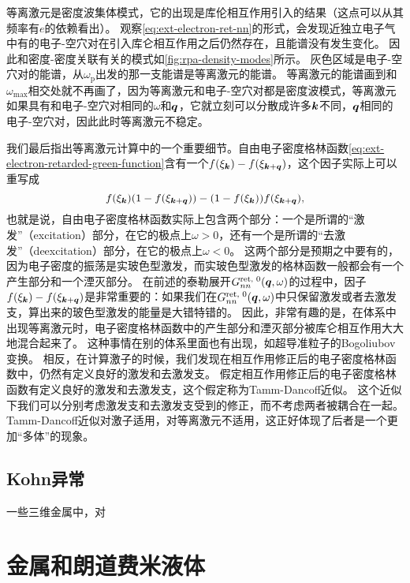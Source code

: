 等离激元是密度波集体模式，它的出现是库伦相互作用引入的结果（这点可以从其频率有$e$的依赖看出）。
观察\eqref{eq:ext-electron-ret-nn}的形式，会发现近独立电子气中有的电子-空穴对在引入库仑相互作用之后仍然存在，且能谱没有发生变化。
因此和密度-密度关联有关的模式如\autoref{fig:rpa-density-modes}所示。
灰色区域是电子-空穴对的能谱，从$\omega_\text{p}$出发的那一支能谱是等离激元的能谱。
等离激元的能谱画到和$\omega_\text{max}$相交处就不再画了，因为等离激元和电子-空穴对都是密度波模式，等离激元如果具有和电子-空穴对相同的$\omega$和$\vb*{q}$，它就立刻可以分散成许多$\vb*{k}$不同，$\vb*{q}$相同的电子-空穴对，因此此时等离激元不稳定。

我们最后指出等离激元计算中的一个重要细节。自由电子密度格林函数\eqref{eq:ext-electron-retarded-green-function}含有一个$f(\xi_{\vb*{k}}) - f(\xi_{\vb*{k}+\vb*{q}})$，这个因子实际上可以重写成
\[
    f(\xi_{\vb*{k}}) (1 - f(\xi_{\vb*{k}+\vb*{q}})) - (1 - f(\xi_{\vb*{k}})) f(\xi_{\vb*{k}+\vb*{q}}),
\]
也就是说，自由电子密度格林函数实际上包含两个部分：一个是所谓的“激发”（excitation）部分，在它的极点上$\omega > 0$，还有一个是所谓的“去激发”（deexcitation）部分，在它的极点上$\omega < 0$。
这两个部分是预期之中要有的，因为电子密度的振荡是实玻色型激发，而实玻色型激发的格林函数一般都会有一个产生部分和一个湮灭部分。
在前述的泰勒展开$G^{\text{ret, 0}}_{nn}(\vb*{q}, \omega)$的过程中，因子$f(\xi_{\vb*{k}}) - f(\xi_{\vb*{k}+\vb*{q}})$是非常重要的：如果我们在$G^{\text{ret, 0}}_{nn}(\vb*{q}, \omega)$中只保留激发或者去激发支，算出来的玻色型激发的能量是大错特错的。
因此，非常有趣的是，在体系中出现等离激元时，电子密度格林函数中的产生部分和湮灭部分被库仑相互作用大大地混合起来了。
这种事情在别的体系里面也有出现，如超导准粒子的Bogoliubov变换。
相反，在计算激子的时候，我们发现在相互作用修正后的电子密度格林函数中，仍然有定义良好的激发和去激发支。
假定相互作用修正后的电子密度格林函数有定义良好的激发和去激发支，这个假定称为Tamm-Dancoff近似。
这个近似下我们可以分别考虑激发支和去激发支受到的修正，而不考虑两者被耦合在一起。
Tamm-Dancoff近似对激子适用，对等离激元不适用，这正好体现了后者是一个更加“多体”的现象。

\subsection{Kohn异常}

一些三维金属中，对

\section{金属和朗道费米液体}\label{sec:landau-fermi-liquid}

